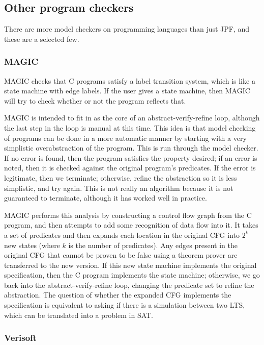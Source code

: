 \documentclass{article}
\begin{document}
\begin{multicols}{2}
\subsection{Other program checkers}

There are more model checkers on programming languages than just JPF,
and these are a selected few.

\subsubsection{MAGIC~\cite{776863}}

MAGIC checks that C programs satisfy a label transition system, which
is like a state machine with edge labels.  If the user gives a state
machine, then MAGIC will try to check whether or not the program
reflects that.

MAGIC is intended to fit in as the core of an abstract-verify-refine
loop, although the last step in the loop is manual at this time.  This
idea is that model checking of programs can be done in a more
automatic manner by starting with a very simplistic overabstraction of
the program.  This is run through the model checker.  If no error is
found, then the program satisfies the property desired; if an error is
noted, then it is checked against the original program's predicates.
If the error is legitimate, then we terminate; otherwise, refine the
abstraction so it is less simplistic, and try again.  This is not
really an algorithm because it is not guaranteed to terminate,
although it has worked well in practice.

MAGIC performs this analysis by constructing a control flow graph from
the C program, and then attempts to add some recognition of data flow
into it.  It takes a set of predicates and then expands each location
in the original CFG into $2^k$ new states (where $k$ is the number of
predicates).  Any edges present in the original CFG that cannot be
proven to be false using a theorem prover are transferred to the new
version.  If this new state machine implements the original
specification, then the C program implements the state machine;
otherwise, we go back into the abstract-verify-refine loop, changing
the predicate set to refine the abstraction.  The question of whether
the expanded CFG implements the specification is equivalent to asking
if there is a simulation between two LTS, which can be translated into
a problem in SAT.

\subsubsection{Verisoft~\cite{263717}}


\end{multicols}
\end{document}
